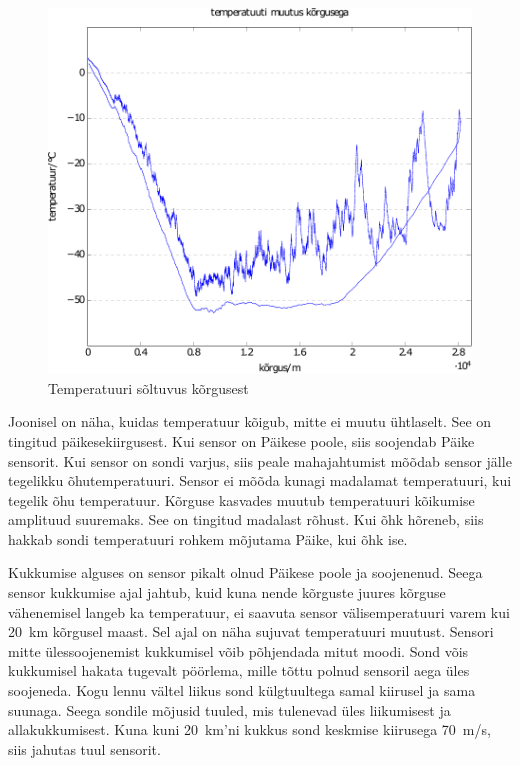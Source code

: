 \documentclass{trkut}%
\begin{document}
\begin{figure}[h]
	\includegraphics[width=1\textwidth]{PicGra/tempkõr.pdf}
	\caption{Temperatuuri sõltuvus kõrgusest}
	\label{TempKõrgus}%
\end{figure}

Joonisel on näha, kuidas temperatuur kõigub, mitte ei muutu ühtlaselt. See on tingitud päikesekiirgusest. Kui sensor on Päikese
poole, siis soojendab Päike sensorit. Kui sensor on sondi varjus, siis peale mahajahtumist mõõdab sensor jälle tegelikku õhutemperatuuri. Sensor ei mõõda kunagi madalamat temperatuuri, kui tegelik õhu temperatuur. Kõrguse kasvades muutub temperatuuri kõikumise amplituud suuremaks. See on tingitud madalast rõhust. Kui õhk hõreneb, siis hakkab sondi temperatuuri rohkem mõjutama Päike, kui õhk ise.

Kukkumise alguses on sensor pikalt olnud Päikese poole ja soojenenud. Seega sensor kukkumise ajal jahtub, kuid kuna nende kõrguste juures kõrguse vähenemisel langeb ka temperatuur, ei saavuta sensor välisemperatuuri varem kui \SI{20}{km} kõrgusel maast. Sel ajal on näha sujuvat temperatuuri muutust. Sensori mitte ülessoojenemist kukkumisel võib põhjendada mitut moodi. Sond võis kukkumisel hakata tugevalt pöörlema, mille tõttu polnud sensoril aega üles soojeneda. Kogu lennu vältel liikus sond külgtuultega samal kiirusel ja sama suunaga. Seega sondile mõjusid tuuled, mis tulenevad üles liikumisest ja allakukkumisest. Kuna kuni \SI{20}{km}'ni kukkus sond keskmise kiirusega \SI{70}{m/s}, siis jahutas tuul sensorit.
\end{document}
